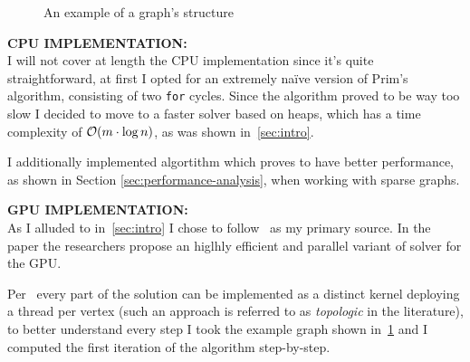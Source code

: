 \documentclass[a4paper,10pt]{article}
\begin{document}
\begin{figure}
	\centering
	
	\caption{An example of a graph's \csr structure}
	\label{tikz:csr-struct}
\end{figure}

\bigskip
{}
\makeatletter{}\makeatother\label{sec:cpu-implementation}
\noindent
\textbf{CPU IMPLEMENTATION:}
\\
I will not cover at length the CPU implementation since it's quite straightforward, at first I opted
for an extremely na\"ive version of Prim's algorithm, consisting of two \texttt{for} cycles.
Since the algorithm proved to be way too slow I decided to move to a faster solver based on heaps,
which has a time complexity of $\mathcal{O}(m \cdot \log{n})$, as was shown in~\ref{sec:intro}.

I additionally implemented \brkas algortithm which proves to have better performance, as shown in Section \ref{sec:performance-analysis}, when working with sparse graphs.

\bigskip
{}
\makeatletter\def\@currentlabel{\texttt{(IV)}}\makeatother\label{sec:gpu-implementation}
\noindent
\textbf{GPU IMPLEMENTATION:}
\\
As I alluded to in~\ref{sec:intro} I chose to follow~\cite{generic-he-boruvka} as my primary source. In the paper the researchers propose an higlhly efficient and parallel variant of \brkas solver for the GPU.

Per~\cite{generic-he-boruvka} every part of the solution can be implemented as a distinct kernel
deploying a thread per vertex (such an approach is referred to as \textit{topologic} in the
literature), to better understand every step I took the example graph shown in~\ref{tikz:csr-struct} and I computed the first iteration of the algorithm step-by-step.
\end{document}
